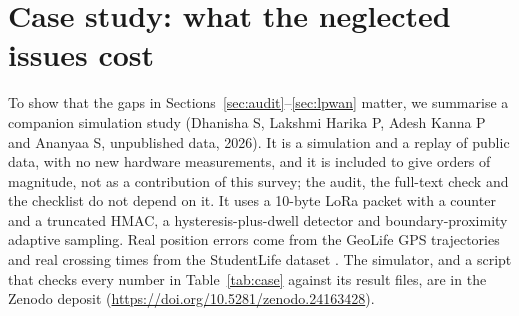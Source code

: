 \documentclass[preprint,12pt]{elsarticle}
\begin{document}
\section{Case study: what the neglected issues cost}\label{sec:case}
To show that the gaps in Sections~\ref{sec:audit}--\ref{sec:lpwan} matter, we summarise a companion simulation study (Dhanisha S, Lakshmi Harika P, Adesh Kanna P and Ananyaa S, unpublished data, 2026). It is a simulation and a replay of public data, with no new hardware measurements, and it is included to give orders of magnitude, not as a contribution of this survey; the audit, the full-text check and the checklist do not depend on it. It uses a 10-byte LoRa packet with a counter and a truncated HMAC, a hysteresis-plus-dwell detector and boundary-proximity adaptive sampling. Real position errors come from the GeoLife GPS trajectories \cite{zheng2009geolife} and real crossing times from the StudentLife dataset \cite{wang2014studentlife}. The simulator, and a script that checks every number in Table~\ref{tab:case} against its result files, are in the Zenodo deposit (\url{https://doi.org/10.5281/zenodo.24163428}).
\end{document}
